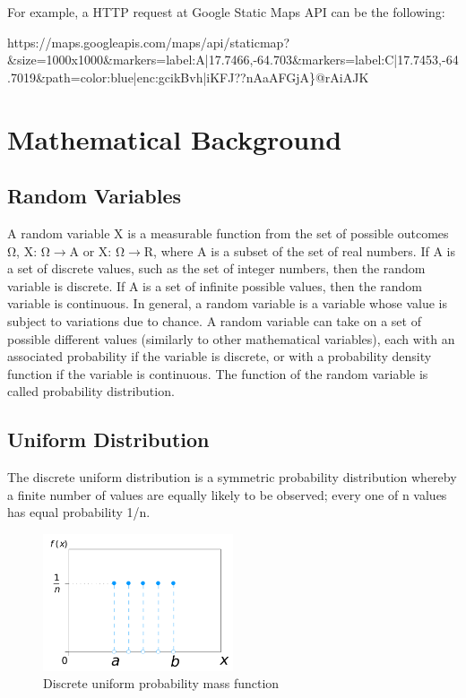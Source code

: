 For example, a HTTP request at Google Static Maps API can be the following:

\begin{center}
 https://maps.googleapis.com/maps/api/staticmap?\&size=1000x1000\&markers=label:A|17.7466,-64.703\&markers=label:C|17.7453,-64.7019\&path=color:blue|enc:gcikBvh|iKFJ??nAaAFGjA\}@rAiAJK
\end{center}

\section{Mathematical Background}

\subsection{Random Variables}

A random variable X is a measurable function from the set of possible outcomes Ω, Χ: Ω\(\rightarrow\)A or Χ: Ω\(\rightarrow\)R, where A is a 
subset of the set of real numbers. If A is a set of discrete values, such as the set of integer numbers, then the random variable is discrete. 
If A is a set of infinite possible values, then the random variable is continuous. In general, a random variable is a variable whose value is 
subject to variations due to chance. A random variable can take on a set of possible different values (similarly to other mathematical variables), 
each with an associated probability if the variable is discrete, or with a probability density function if the variable is continuous. 
The function of the random variable is called probability distribution.

\subsection{Uniform Distribution}

The discrete uniform distribution is a symmetric probability distribution whereby a finite number of values are equally likely to be observed; 
every one of n values has equal probability 1/n. 

\begin{figure}[H]
  \centering
  \includegraphics[width=0.5\textwidth]{figures/uniform_1.png}
  \caption{Discrete uniform probability mass function \cite{19}}
\end{figure}

